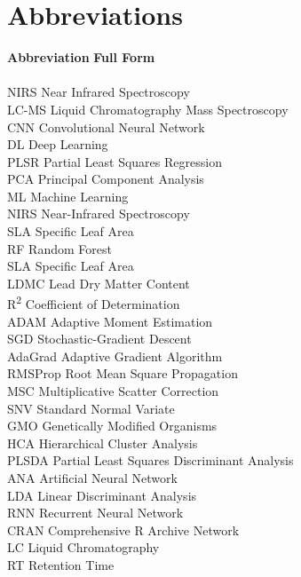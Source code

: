 \documentclass[12pt,a4paper]{report}
\begin{document}
\newpage
\tableofcontents


\newpage
\section*{Abbreviations}
\begin{tabbing}
    \textbf{Abbreviation} \hspace{2cm} \= \textbf{Full Form} \\ 
  \\

    NIRS \> Near Infrared Spectroscopy \\
    LC-MS \> Liquid Chromatography Mass Spectroscopy \\
    CNN \> Convolutional Neural Network \\
    DL \> Deep Learning \\
    PLSR \> Partial Least Squares Regression \\
    PCA \> Principal Component Analysis \\
    ML \> Machine Learning \\
    NIRS \> Near-Infrared Spectroscopy \\
    SLA \> Specific Leaf Area \\
    RF \> Random Forest \\
    SLA \> Specific Leaf Area \\
    LDMC \> Lead Dry Matter Content \\
    R\textsuperscript{2} \> Coefficient of Determination \\
    ADAM \> Adaptive Moment Estimation \\
    SGD \> Stochastic-Gradient Descent \\
    AdaGrad \> Adaptive Gradient Algorithm \\
    RMSProp \> Root Mean Square Propagation \\
    MSC \> Multiplicative Scatter Correction \\
    SNV \> Standard Normal Variate \\
    GMO \> Genetically Modified Organisms \\
    HCA \> Hierarchical Cluster Analysis \\
    PLSDA  \> Partial Least Squares Discriminant Analysis \\
    ANA \>  Artificial Neural Network \\
    LDA \> Linear Discriminant Analysis \\
    RNN \> Recurrent Neural Network \\
    CRAN \> Comprehensive R Archive Network \\
    LC \> Liquid Chromatography \\
    RT \> Retention Time \\

\end{tabbing}
\end{document}
